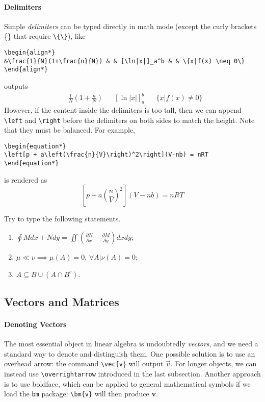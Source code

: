 \paragraph{Delimiters}
Simple \textit{delimiters} can be typed directly in math mode (except the curly brackets \{\} that require \texttt{\textbackslash\{\textbackslash\}}), like
\begin{lstlisting}
\begin{align*}
&\frac{1}{N}(1+\frac{n}{N}) & & [\ln|x|]_a^b & & \{x|f(x) \neq 0\} 
\end{align*}
\end{lstlisting}
outputs
\begin{align*}
&\frac{1}{N}(1+\frac{n}{N}) & & [\ln|x|]_a^b & & \{x|f(x) \neq 0\}  
\end{align*}
However, if the content inside the delimiters is too tall, then we can append \texttt{\textbackslash left} and \texttt{\textbackslash right} before the delimiters on both sides to match the height. Note that they must be balanced. For example,
\begin{lstlisting}
\begin{equation*}
\left[p + a\left(\frac{n}{V}\right)^2\right](V-nb) = nRT
\end{equation*}
\end{lstlisting}
is rendered as
\begin{equation*}
\left[p + a\left(\frac{n}{V}\right)^2\right](V-nb) = nRT
\end{equation*}

\begin{exercisebox}
\begin{Exercise}
Try to type the following statements.
\begin{enumerate}[label=\alph*)]
    \item $\oint M dx + Ndy = \iint (\frac{\partial N}{\partial x} - \frac{\partial M}{\partial y}) dxdy$;
    \item $\mu \ll \nu \implies \mu(A) = 0$, $\forall A|\nu(A) = 0$;
    \item $A \subseteq B \cup (A \cap B^c)$.
\end{enumerate}
\end{Exercise}
\end{exercisebox}

\subsection{Vectors and Matrices}

\paragraph{Denoting Vectors}
The most essential object in linear algebra is undoubtedly \textit{vectors}, and we need a standard way to denote and distinguish them. One possible solution is to use an overhead arrow: the command \texttt{\textbackslash vec\{v}\} will output $\vec{v}$. For longer objects, we can instead use \texttt{\textbackslash overrightarrow} introduced in the last subsection. Another approach is to use boldface, which can be applied to general mathematical symbols if we load the \verb|bm| package: \texttt{\textbackslash bm\{v\}} will then produce $\bm{v}$.

